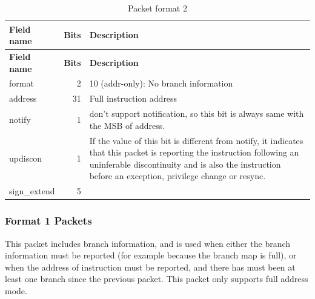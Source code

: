 \documentclass[main\_\_EN.tex]{subfiles}
\begin{document}
\begin{longtable}[c]{ |l|r|L{11cm}| }
    \caption{Packet format 2}
    \label{tab:f2}
    \\\hline{}
    \textbf{Field name} & \textbf{Bits} & \textbf{Description} \\\hline
    \endfirsthead

    \hline
    \textbf{Field name} & \textbf{Bits} & \textbf{Description} \\\hline
    \endhead
    \endfoot
    \endlastfoot

    format & 2 & 10 (addr-only): No branch information \\\hline
    address & 31 & Full instruction address \\\hline
    notify & 1 & \chipname{} don't support notification, so this bit is always same with the MSB of address. \\\hline
    updiscon & 1 & If the value of this bit is different from notify, it indicates that this packet is reporting the instruction following an uninferable discontinuity and is also the instruction before an exception, privilege change or resync. \\\hline
    sign\_extend & 5
    &  \\\hline
 \end{longtable}


\subsubsection{Format 1 Packets}

This packet includes branch information, and is used when either the branch information must be reported (for example because the branch map is full), or when the address of instruction must be reported, and there has must been at least one branch since the previous packet. This packet only supports full address mode.
\end{document}

